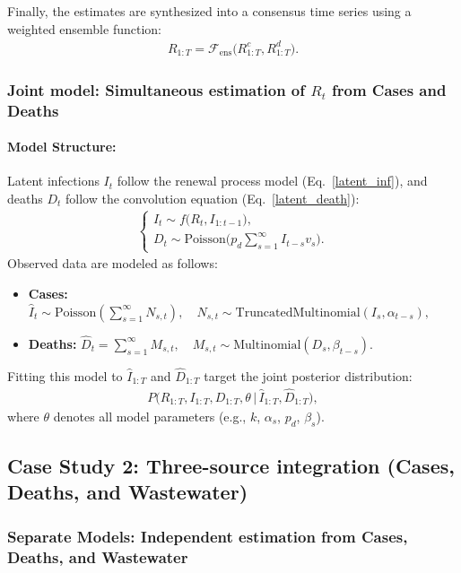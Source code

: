 \documentclass{article}
\begin{document}
Finally, the estimates are synthesized into a consensus time series using a weighted ensemble function:
\begin{align}
R_{1:T} = \mathcal{F}_{\mathrm{ens}}\big(R_{1:T}^c, R_{1:T}^d\big).
\end{align}

\subsubsection{Joint model: Simultaneous estimation of $R_{t}$ from Cases and Deaths}

\paragraph{Model Structure:}
Latent infections $I_{t}$ follow the renewal process model (Eq.~\eqref{latent_inf}), and deaths $D_t$ follow the convolution equation (Eq.~\eqref{latent_death}):
\begin{align}
\begin{cases}
I_t \sim f\big(R_t, I_{1:t-1}\big),\\[4pt]
D_t \sim \mathrm{Poisson}\!\Big( p_d \sum_{s=1}^\infty I_{t-s} v_s \Big).
\end{cases}
\end{align}
Observed data are modeled as follows:
\begin{itemize}
    \item \textbf{Cases:} $\widehat{I}_t \sim \mathrm{Poisson}\left( \sum_{s=1}^\infty N_{s,t} \right), \quad N_{s,t} \sim \mathrm{TruncatedMultinomial}(I_s, \alpha_{t-s}),$
    \item \textbf{Deaths:} $\widehat{D}_t = \sum_{s=1}^\infty M_{s,t}, \quad M_{s,t} \sim \mathrm{Multinomial}(D_s, \beta_{t-s}).$
\end{itemize}
Fitting this model to $\widehat{I}_{1:T}$ and $\widehat{D}_{1:T}$ target the joint posterior distribution:
\begin{align}
P\big(R_{1:T}, I_{1:T}, D_{1:T}, \theta \,\big|\, \widehat{I}_{1:T}, \widehat{D}_{1:T}\big),
\end{align}
where $\theta$ denotes all model parameters (e.g., $k$, $\alpha_s$, $p_d$, $\beta_s$).


\subsection{Case Study 2: Three-source integration (Cases, Deaths, and Wastewater)}

\subsubsection{Separate Models: Independent estimation from Cases, Deaths, and Wastewater}
\end{document}
